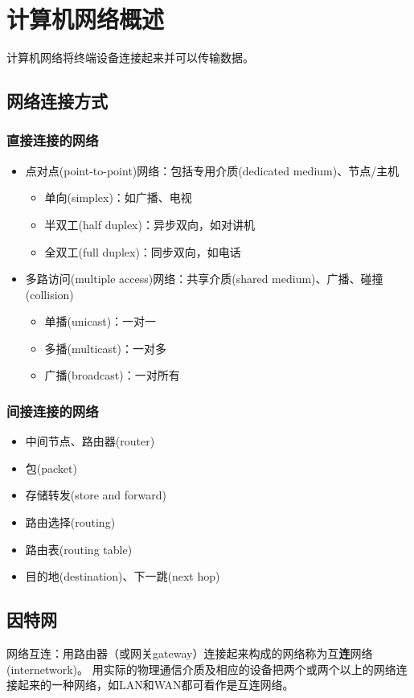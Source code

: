 
\section{计算机网络概述}
计算机网络将终端设备连接起来并可以传输数据。

\subsection{网络连接方式}
\subsubsection{直接连接的网络}
\begin{itemize}
\item 点对点(point-to-point)网络：包括专用介质(dedicated medium)、节点/主机
\begin{itemize}
	\item 单向(simplex)：如广播、电视
	\item 半双工(half duplex)：异步双向，如对讲机
	\item 全双工(full duplex)：同步双向，如电话
\end{itemize}
\item 多路访问(multiple access)网络：共享介质(shared medium)、广播、碰撞(collision)
\begin{itemize}
	\item 单播(unicast)：一对一
	\item 多播(multicast)：一对多
	\item 广播(broadcast)：一对所有
\end{itemize}
\end{itemize}

\subsubsection{间接连接的网络}
\begin{itemize}
	\item 中间节点、路由器(router)
	\item 包(packet)
	\item 存储转发(store and forward)
	\item 路由选择(routing)
	\item 路由表(routing table)
	\item 目的地(destination)、下一跳(next hop)
\end{itemize}

\subsection{因特网}
网络互连：用路由器（或网关gateway）连接起来构成的网络称为互\textbf{连}网络(internetwork)。
用实际的物理通信介质及相应的设备把两个或两个以上的网络连接起来的一种网络，如LAN和WAN都可看作是互连网络。


